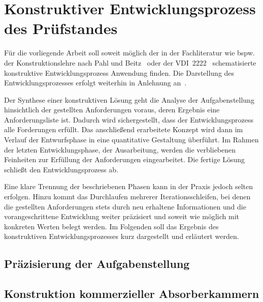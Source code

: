 

\chapter{Konstruktiver Entwicklungsprozess des Prüfstandes}\label{cha:3}

Für die vorliegende Arbeit soll soweit möglich der in der Fachliteratur wie bspw. der Konstruktionslehre nach Pahl und Beitz~\cite{Pahl_Beitz_Konstruktionslehre} oder der VDI~2222~\cite{VDI_2222-1} schematisierte konstruktive Entwicklungsprozess Anwendung finden. Die Darstellung des Entwicklungsprozesses erfolgt weiterhin in Anlehnung an~\cite{Projektarbeit}.
\par
\vspace{\linespace}
Der Synthese einer konstruktiven Lösung geht die Analyse der Aufgabenstellung hinsichtlich der gestellten Anforderungen voraus, deren Ergebnis eine Anforderungsliste ist. Dadurch wird sichergestellt, dass der Entwicklungsprozess alle Forderungen erfüllt. Das anschließend erarbeitete Konzept wird dann im Verlauf der Entwurfsphase in eine quantitative Gestaltung überführt. Im Rahmen der letzten Entwicklungsphase, der Ausarbeitung, werden die verbliebenen Feinheiten zur Erfüllung der Anforderungen eingearbeitet. Die fertige Lösung schließt den Entwicklungsprozess ab.
\par
\vspace{\linespace}
Eine klare Trennung der beschriebenen Phasen kann in der Praxis jedoch selten erfolgen. Hinzu kommt das Durchlaufen mehrerer Iterationsschleifen, bei denen die gestellten Anforderungen stets durch neu erhaltene Informationen und die vorangeschrittene Entwicklung weiter präzisiert und soweit wie möglich mit konkreten Werten belegt werden. Im Folgenden soll das Ergebnis des konstruktiven Entwicklungsprozesses kurz dargestellt und erläutert werden.   


\section{Präzisierung der Aufgabenstellung}\label{cha:3_Praezisierung_Aufgabenstellung}





\section{Konstruktion kommerzieller Absorberkammern}\label{cha:3_Konstruktion_kommerzieller_Absorberkammern}

